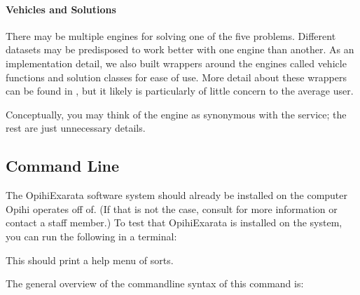 \documentclass[letterpaper,11pt,english]{sphinxmanual}
\begin{document}
\paragraph{Vehicles and Solutions}
\label{\detokenize{user/system_framework:vehicles-and-solutions}}
\sphinxAtStartPar
There may be multiple engines for solving one of the five problems. Different
datasets may be predisposed to work better with one engine than another. As an
implementation detail, we also built wrappers around the engines called
vehicle functions and solution classes for ease of use. More detail about these
wrappers can be found in {\hyperref[\detokenize{technical/architecture/vehicles_solutions:technical-architecture-vehicles-solutions}]{}}, but
it likely is particularly of little concern to the average user.

\sphinxAtStartPar
Conceptually, you may think of the engine as synonymous with the service; the
rest are just unnecessary details.

\sphinxstepscope


\subsection{Command Line}
\label{\detokenize{user/command_line:command-line}}\label{\detokenize{user/command_line:user-command-line}}\label{\detokenize{user/command_line::doc}}
\sphinxAtStartPar
The OpihiExarata software system should already be installed on the computer
Opihi operates off of. (If that is not the case, consult
{\hyperref[\detokenize{technical/installation/index:technical-installation}]{}} for more information or contact a staff member.)
To test that OpihiExarata is installed on the system, you can run the
following in a terminal:

\begin{sphinxVerbatim}[commandchars=\\\{\}]
\end{sphinxVerbatim}

\sphinxAtStartPar
This should print a help menu of sorts.

\sphinxAtStartPar
The general overview of the command\sphinxhyphen{}line syntax of this command is:

\begin{sphinxVerbatim}[commandchars=\\\{\}]
 \PYG{p}{[}\PYG{p}{]} \PYG{p}{[}\PYG{p}{]}
\end{sphinxVerbatim}
\end{document}
